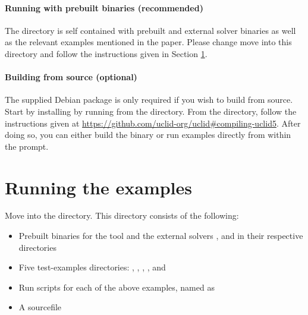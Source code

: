 \documentclass[runningheads]{llncs}
\begin{document}
\paragraph{Running with prebuilt binaries (recommended)}

The  directory is self contained with prebuilt \uclidcmd and external solver binaries as well as the relevant examples mentioned in the paper. Please change move into this directory and follow the instructions given in Section \ref{sec:running}.


\paragraph{Building from source (optional)} The supplied  Debian package is only required if you wish to build \uclidcmd from source. Start by installing  by running  from the  directory. From the  directory, follow the instructions given at \url{https://github.com/uclid-org/uclid#compiling-uclid5}. After doing so, you can either build the \uclidcmd binary or run examples directly from within the  prompt.


\section{Running the examples}
\label{sec:running}

Move into the  directory. This directory consists of the following:

\begin{itemize}
    \item Prebuilt binaries for the \uclidcmd tool and the external solvers ,  and  in their respective directories
    \item Five test-examples directories: , ,
    ,
    , and
    \item Run scripts for each of the above examples, named as 
    \item A  sourcefile
\end{itemize}
\end{document}
